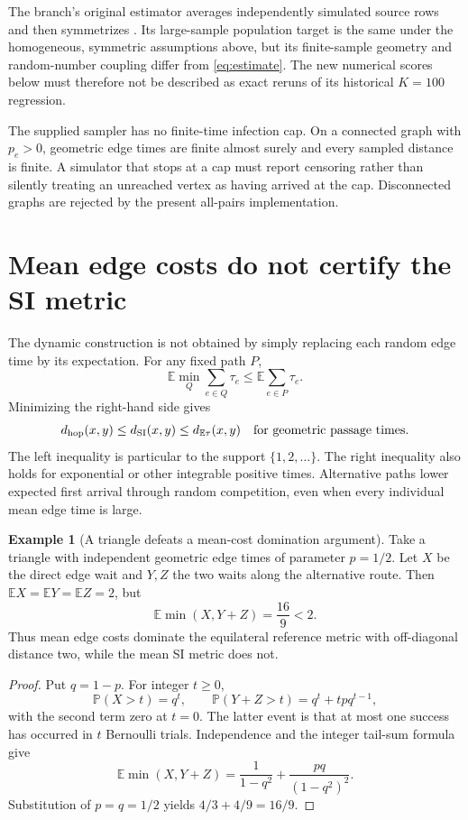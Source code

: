 \documentclass[11pt,letterpaper]{article}
\theoremstyle{definition}
\newtheorem{example}[theorem]{Example}
\theoremstyle{remark}
\newcommand{\E}{\mathbb E}
\newcommand{\Prob}{\mathbb P}
\newcommand{\dSI}{d_{\mathrm{SI}}}
\begin{document}
The branch's original estimator averages independently simulated source rows and then symmetrizes \cite{leblondSI}. Its large-sample population target is the same under the homogeneous, symmetric assumptions above, but its finite-sample geometry and random-number coupling differ from \eqref{eq:estimate}. The new numerical scores below must therefore not be described as exact reruns of its historical $K=100$ regression.

The supplied sampler has no finite-time infection cap. On a connected graph with $p_e>0$, geometric edge times are finite almost surely and every sampled distance is finite. A simulator that stops at a cap must report censoring rather than silently treating an unreached vertex as having arrived at the cap. Disconnected graphs are rejected by the present all-pairs implementation.

\section{Mean edge costs do not certify the SI metric}\label{sec:meantrap}
The dynamic construction is not obtained by simply replacing each random edge time by its expectation. For any fixed path $P$,
\begin{equation}
 \E\min_Q\sum_{e\in Q}\tau_e
 \leq\E\sum_{e\in P}\tau_e.
\end{equation}
Minimizing the right-hand side gives
\begin{equation}
 d_{\rm hop}(x,y)\leq\dSI(x,y)\leq d_{\E\tau}(x,y)
 \quad\text{for geometric passage times}.
 \label{eq:jensen}
\end{equation}
The left inequality is particular to the support $\{1,2,\ldots\}$. The right inequality also holds for exponential or other integrable positive times. Alternative paths lower expected first arrival through random competition, even when every individual mean edge time is large.

\begin{example}[A triangle defeats a mean-cost domination argument]\label{ex:triangle}
Take a triangle with independent geometric edge times of parameter $p=1/2$. Let $X$ be the direct edge wait and $Y,Z$ the two waits along the alternative route. Then $\E X=\E Y=\E Z=2$, but
\begin{equation}
 \E\min(X,Y+Z)=\frac{16}{9}<2.
 \label{eq:triangle}
\end{equation}
Thus mean edge costs dominate the equilateral reference metric with off-diagonal distance two, while the mean SI metric does not.
\end{example}
\begin{proof}
Put $q=1-p$. For integer $t\geq0$,
\begin{equation}
 \Prob(X>t)=q^t,\qquad
 \Prob(Y+Z>t)=q^t+tpq^{t-1},
\end{equation}
with the second term zero at $t=0$. The latter event is that at most one success has occurred in $t$ Bernoulli trials. Independence and the integer tail-sum formula give
\begin{equation}
 \E\min(X,Y+Z)=\frac{1}{1-q^2}+
 \frac{pq}{(1-q^2)^2}.
\end{equation}
Substitution of $p=q=1/2$ yields $4/3+4/9=16/9$.
\end{proof}
\end{document}
